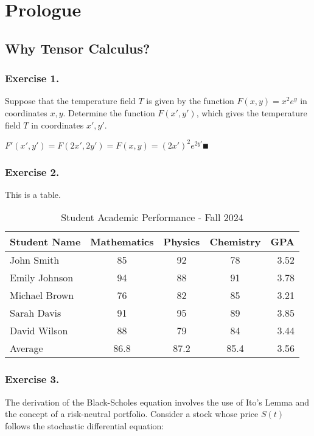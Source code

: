 \documentclass[../main.tex]{subfiles}
\begin{document}
\vfill
\chapter{Prologue}

\vfill
\newpage
\section{Why Tensor Calculus?}
\subsection{Exercise 1.}
Suppose that the temperature field $T$ is given by the function $F(x,y)=x^2e^y$ in coordinates $x, y$. Determine the function $F(x',y')$, which gives the temperature field $T$ in coordinates $x',y'$.

\sol

$F'(x',y')=F(2x',2y')=F(x,y)=(2x')^2e^{2y'}\QED$

\subsection{Exercise 2.}

This is a table.

\begin{table}[h]
    \centering
    \caption{Student Academic Performance - Fall 2024}
    \label{tab:student_performance}
    \begin{tabular}{@{}lcccr@{}}
        \toprule
        Student Name & Mathematics & Physics & Chemistry & GPA \\
        \midrule
        John Smith & 85 & 92 & 78 & 3.52 \\
        Emily Johnson & 94 & 88 & 91 & 3.78 \\
        Michael Brown & 76 & 82 & 85 & 3.21 \\
        Sarah Davis & 91 & 95 & 89 & 3.85 \\
        David Wilson & 88 & 79 & 84 & 3.44 \\
        \midrule
        Average & 86.8 & 87.2 & 85.4 & 3.56 \\
        \bottomrule
    \end{tabular}
\end{table}

\subsection{Exercise 3.}
The derivation of the Black-Scholes equation involves the use of Ito's Lemma and the concept of a risk-neutral portfolio. Consider a stock whose price \( S(t) \) follows the stochastic differential equation:
\end{document}
